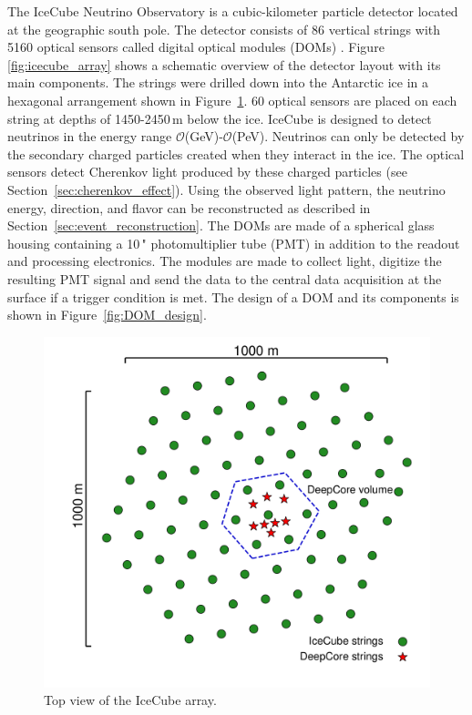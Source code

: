The IceCube Neutrino Observatory \cite{2017JInst..12P3012A_Instrumentation_Systems} is a cubic-kilometer particle detector located at the geographic south pole.
The detector consists of 86 vertical strings with 5160 optical sensors called digital optical modules (DOMs) \cite{ABBASI2009294_data_acquisition}.
Figure \ref{fig:icecube_array} shows a schematic overview of the detector layout with its main components.
The strings were drilled down into the Antarctic ice in a hexagonal arrangement shown in Figure~\ref{fig:icecube_top_view}.
60 optical sensors are placed on each string at depths of 1450-2450\,m below the ice.
IceCube is designed to detect neutrinos in the energy range $\mathcal{O}$(GeV)-$\mathcal{O}$(PeV).
Neutrinos can only be detected by the secondary charged particles created when they interact in the ice.
The optical sensors detect Cherenkov light produced by these charged particles (see Section~\ref{sec:cherenkov_effect}).
Using the observed light pattern, the neutrino energy, direction, and flavor can be reconstructed as described in Section~\ref{sec:event_reconstruction}.
The DOMs are made of a spherical glass housing containing a 10\," photomultiplier tube (PMT) in addition to the readout and processing electronics.
The modules are made to collect light, digitize the resulting PMT signal and send the data to the central data acquisition at the surface if a trigger condition is met.
The design of a DOM and its components is shown in Figure~\ref{fig:DOM_design}.

\begin{figure}[h]
    \begin{center}
        \includegraphics[trim={2.0cm, 1.5cm, 0, 0}, clip, width=0.65\linewidth]{figures/icecube_top_view_bw.pdf}
    \end{center}
    \caption[IceCube top view]{Top view of the IceCube array.}
    \label{fig:icecube_top_view}
\end{figure}


